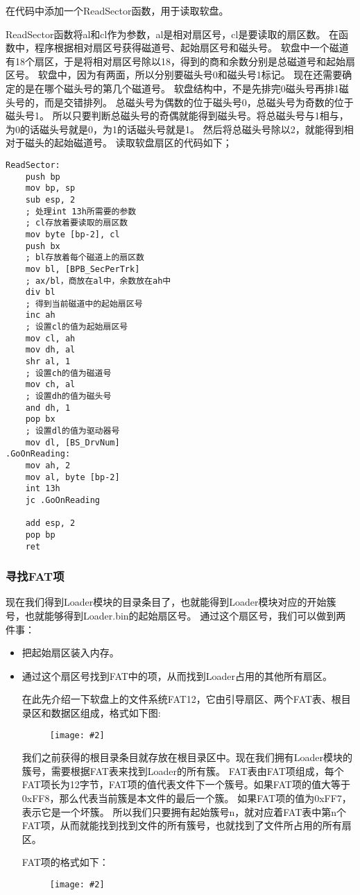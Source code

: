 \documentclass[a4paper,left=2.5cm,right=2.5cm,11pt]{article}
\newcommand{\sizedfic}[2]{\begin{figure}[H]
		\center
		\texttt{[image: \#2]}
	\end{figure}}
\begin{document}
	在代码中添加一个ReadSector函数，用于读取软盘。\par
	ReadSector函数将al和cl作为参数，al是相对扇区号，cl是要读取的扇区数。
	在函数中，程序根据相对扇区号获得磁道号、起始扇区号和磁头号。
	软盘中一个磁道有18个扇区，于是将相对扇区号除以18，得到的商和余数分别是总磁道号和起始扇区号。
	软盘中，因为有两面，所以分别要磁头号0和磁头号1标记。
	现在还需要确定的是在哪个磁头号的第几个磁道号。
	软盘结构中，不是先排完0磁头号再排1磁头号的，而是交错排列。
	总磁头号为偶数的位于磁头号0，总磁头号为奇数的位于磁头号1。
	所以只要判断总磁头号的奇偶就能得到磁头号。将总磁头号与1相与，为0的话磁头号就是0，为1的话磁头号就是1。
	然后将总磁头号除以2，就能得到相对于磁头的起始磁道号。
	读取软盘扇区的代码如下；
	\begin{lstlisting}
ReadSector:
	push bp
	mov bp, sp
	sub esp, 2
	; 处理int 13h所需要的参数
	; cl存放着要读取的扇区数
	mov byte [bp-2], cl
	push bx
	; bl存放着每个磁道上的扇区数
	mov bl, [BPB_SecPerTrk]
	; ax/bl，商放在al中，余数放在ah中
	div bl
	; 得到当前磁道中的起始扇区号
	inc ah
	; 设置cl的值为起始扇区号
	mov cl, ah
	mov dh, al
	shr al, 1
	; 设置ch的值为磁道号
	mov ch, al
	; 设置dh的值为磁头号
	and dh, 1
	pop bx
	; 设置dl的值为驱动器号
	mov dl, [BS_DrvNum]
.GoOnReading:
	mov ah, 2
	mov al, byte [bp-2]
	int 13h
	jc .GoOnReading

	add esp, 2
	pop bp
	ret
	\end{lstlisting}

\subsubsection{寻找FAT项}
	现在我们得到Loader模块的目录条目了，也就能得到Loader模块对应的开始簇号，也就能够得到Loader.bin的起始扇区号。
	通过这个扇区号，我们可以做到两件事：
	\begin{itemize}
		\item 把起始扇区装入内存。
		\item 通过这个扇区号找到FAT中的项，从而找到Loader占用的其他所有扇区。\par
		在此先介绍一下软盘上的文件系统FAT12，它由引导扇区、两个FAT表、根目录区和数据区组成，格式如下图:
		\sizedfic{0.6}{2.png}

		我们之前获得的根目录条目就存放在根目录区中。现在我们拥有Loader模块的簇号，需要根据FAT表来找到Loader的所有簇。
		FAT表由FAT项组成，每个FAT项长为12字节，FAT项的值代表文件下一个簇号。如果FAT项的值大等于0xFF8，那么代表当前簇是本文件的最后一个簇。
		如果FAT项的值为0xFF7，表示它是一个坏簇。
		所以我们只要拥有起始簇号n，就对应着FAT表中第n个FAT项，从而就能找到找到文件的所有簇号，也就找到了文件所占用的所有扇区。\par
		FAT项的格式如下：
		\sizedfic{0.6}{3.png}
	\end{itemize}
\end{document}
